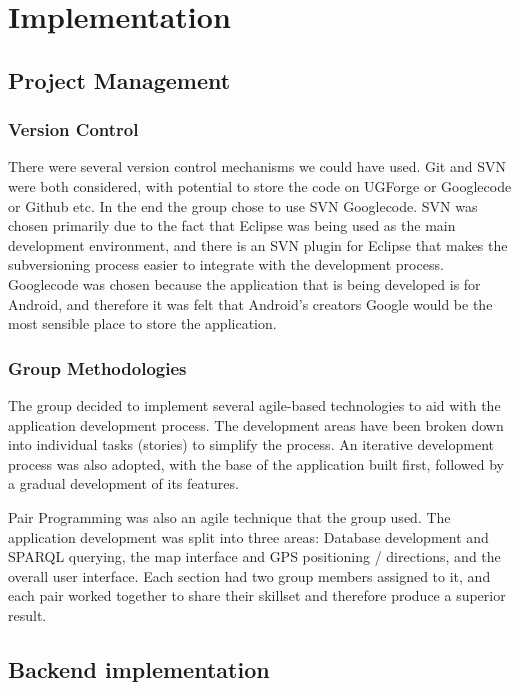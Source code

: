 \section{Implementation}

\subsection{Project Management}

\subsubsection{Version Control}
\label{sec:VersionControl}

There were several version control mechanisms we could have used. Git and SVN were both considered, with potential to store the code on UGForge or Googlecode or Github etc. In the end the group chose to use SVN Googlecode. SVN was chosen primarily due to the fact that Eclipse was being used as the main development environment, and there is an SVN plugin for Eclipse that makes the subversioning process easier to integrate with the development process. Googlecode was chosen because the application that is being developed is for Android, and therefore it was felt that Android’s creators Google would be the most sensible place to store the application. 

\subsubsection{Group Methodologies}
The group decided to implement several agile-based technologies to aid with the application development process. The development areas have been broken down into individual tasks (stories) to simplify the process. An iterative development process was also adopted, with the base of the application built first, followed by a gradual development of its features. 

Pair Programming was also an agile technique that the group used. The application development was split into three areas: Database development and SPARQL querying, the map interface and GPS positioning / directions, and the overall user interface. Each section had two group members assigned to it, and each pair worked together to share their skillset and therefore produce a superior result. 

\subsection{Backend implementation}
